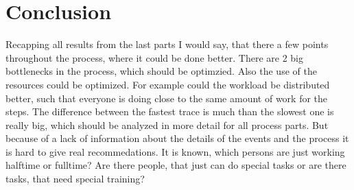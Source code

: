 \section{Conclusion}

Recapping all results from the last parts I would say, that there a few points throughout the process, where it could be done better. There are 2 big bottlenecks in the process, which should be optimzied. Also the use of the resources could be optimized. For example could the workload be distributed better, such that everyone is doing close to the same amount of work for the steps.  The difference between the fastest trace is much than the slowest one is really big, which should be analyzed in more detail for all process parts. But because of a lack of information about the details of the events and the process it is hard to give real recommedations. It is known, which persons are just working halftime or fulltime? Are there people, that just can do special tasks or are there tasks, that need special training?